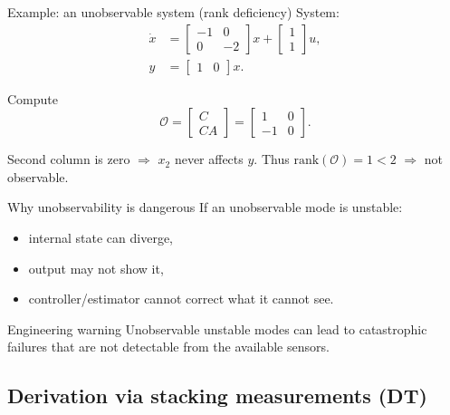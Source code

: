 \documentclass[aspectratio=169,10pt]{beamer}
\newcommand{\Ocal}{\mathcal{O}}
\begin{document}
\begin{frame}{Example: an unobservable system (rank deficiency)}
System:
\begin{align*}
\dot{x} &= \begin{bmatrix}-1 & 0\\0 & -2\end{bmatrix}x + \begin{bmatrix}1\\1\end{bmatrix}u,\\
y &= \begin{bmatrix}1 & 0\end{bmatrix}x.
\end{align*}

Compute
\[
\Ocal=
\begin{bmatrix}
C\\CA
\end{bmatrix}
=
\begin{bmatrix}
1 & 0\\
-1 & 0
\end{bmatrix}.
\]

Second column is zero \(\Rightarrow\) \(x_2\) never affects \(y\).
Thus \(\mathrm{rank}(\Ocal)=1<2\) \(\Rightarrow\) not observable.
\end{frame}

\begin{frame}{Why unobservability is dangerous}
If an unobservable mode is unstable:
\begin{itemize}
  \item internal state can diverge,
  \item output may not show it,
  \item controller/estimator cannot correct what it cannot see.
\end{itemize}

\begin{alertbox}{Engineering warning}
Unobservable unstable modes can lead to catastrophic failures that are not detectable from the available sensors.
\end{alertbox}
\end{frame}

\subsection{Derivation via stacking measurements (DT)}
\end{document}

